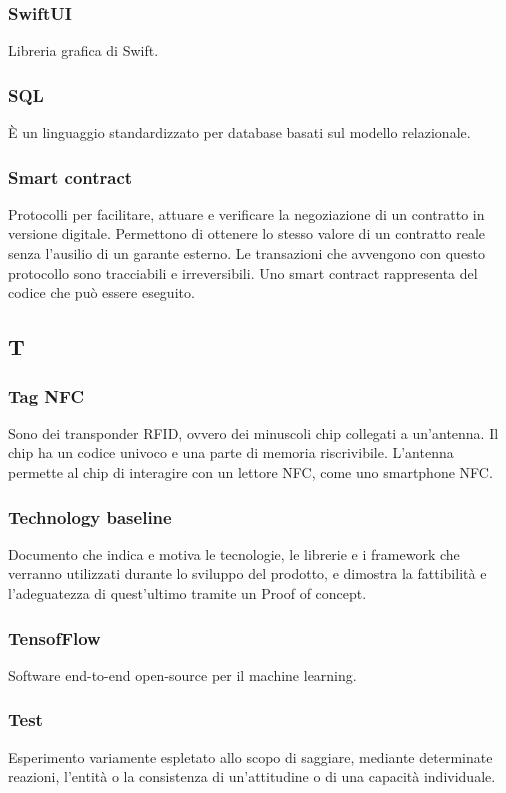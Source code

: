 \subsubsection*{SwiftUI} Libreria grafica di Swift.
\subsubsection*{SQL} È un linguaggio standardizzato per database basati sul modello relazionale.
\subsubsection*{Smart contract} Protocolli per facilitare, attuare e verificare la negoziazione di un contratto in versione digitale.
Permettono di ottenere lo stesso valore di un contratto reale senza l'ausilio di un garante esterno. Le transazioni che avvengono con questo protocollo sono tracciabili e irreversibili. Uno smart contract rappresenta del codice che può essere eseguito.
\subsection*{T}
\subsubsection*{Tag NFC} Sono dei transponder RFID, ovvero dei minuscoli chip collegati a un'antenna. Il chip ha un codice univoco e una parte di memoria riscrivibile. L'antenna permette al chip di interagire con un lettore NFC, come uno smartphone NFC.
\subsubsection*{Technology baseline} Documento che indica e motiva le tecnologie, le librerie e
i framework che verranno utilizzati durante lo sviluppo del prodotto, e dimostra la fattibilità e l'adeguatezza di quest'ultimo tramite un Proof of concept.
\subsubsection*{TensofFlow} Software end-to-end open-source per il machine learning.
\subsubsection*{Test} Esperimento variamente espletato allo scopo di saggiare, mediante determinate reazioni, l'entità o la consistenza di un'attitudine o di una capacità individuale.
